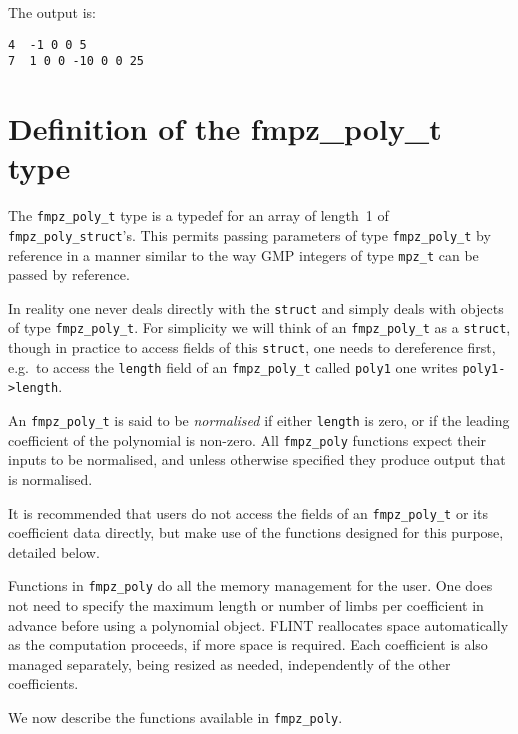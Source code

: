 \documentclass[a4paper,10pt]{book}
\newcommand{\code}{\lstinline}
\begin{document}
The output is:
\begin{lstlisting}
4  -1 0 0 5
7  1 0 0 -10 0 0 25
\end{lstlisting}

\section{Definition of the fmpz\_poly\_t type}

The \code{fmpz_poly_t} type is a typedef for an array of length~1 of 
\code{fmpz_poly_struct}'s.  This permits passing parameters of type 
\code{fmpz_poly_t} by reference in a manner similar to the way GMP integers 
of type \code{mpz_t} can be passed by reference. 

In reality one never deals directly with the \code{struct} and simply deals 
with objects of type \code{fmpz_poly_t}.  For simplicity we will think of an 
\code{fmpz_poly_t} as a \code{struct}, though in practice to access fields 
of this \code{struct}, one needs to dereference first, e.g.\ to access the 
\code{length} field of an \code{fmpz_poly_t} called \code{poly1} one writes 
\code{poly1->length}. 

An \code{fmpz_poly_t} is said to be \emph{normalised} if either 
\code{length} is zero, or if the leading coefficient of the polynomial is 
non-zero.  All \code{fmpz_poly} functions expect their inputs to be 
normalised, and unless otherwise specified they produce output that is 
normalised. 

It is recommended that users do not access the fields of an 
\code{fmpz_poly_t} or its coefficient data directly, but make use of the 
functions designed for this purpose, detailed below.

Functions in \code{fmpz_poly} do all the memory management for the user. 
One does not need to specify the maximum length or number of limbs per 
coefficient in advance before using a polynomial object.  FLINT reallocates 
space automatically as the computation proceeds, if more space is required. 
Each coefficient is also managed separately, being resized as needed, 
independently of the other coefficients.

We now describe the functions available in \code{fmpz_poly}.



\end{document}
